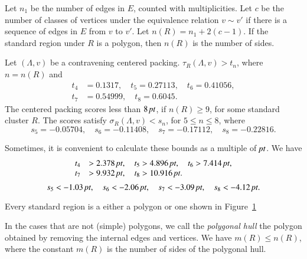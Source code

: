 Let $n_1$ be the number of edges in $E$, counted with multiplicities.
Let $c$ be the number of classes of vertices under the equivalence
relation $v\sim v'$ if there is a sequence of edges in $E$ from $v$ to
$v'$. Let $n(R)=n_1+2(c-1)$. If the standard region under $R$ is a
polygon, then $n(R)$ is the number of sides.

\begin{theorem}
    \label{thm:the-main-theorem}
    Let $(\Lambda,v)$ be a contravening centered packing.
$\tau_R(\Lambda,v) > t_n$, where $n=n(R)$ and
    $$
    \begin{array}{lll}
    t_4&=0.1317,\quad t_5=0.27113,\quad
    t_6=0.41056,\\
    t_7&=0.54999,\quad t_8=0.6045.
    \end{array}
    $$
The centered packing scores less than $8\,\hbox{\it pt}$, if $n(R)\ge 9$,
for some standard cluster $R$. The scores satisfy
$\sigma_R(\Lambda,v)<s_n$, for $5\le n\le 8$, where
    $$
    s_5=-0.05704,\quad s_6=-0.11408,\quad
    s_7=-0.17112,\quad s_8=-0.22816.
    $$
\end{theorem}

Sometimes, it is convenient to calculate these bounds as a multiple
of $\hbox{\it pt}$.  We have
    $$
    \begin{array}{lll}
    t_4&>2.378\,\hbox{\it pt},\quad t_5>4.896\,\hbox{\it pt},\quad
    t_6>7.414\,\hbox{\it pt},\\
    t_7&>9.932\,\hbox{\it pt},\quad
    t_8>10.916\,\hbox{\it pt}.
    \end{array}
    $$
    $$
    s_5 < -1.03\,\hbox{\it pt},\quad s_6<-2.06\,\hbox{\it pt},\quad
    s_7<-3.09\,\hbox{\it pt},\quad s_8<-4.12\,\hbox{\it pt}.
    $$




\begin{corollary}
    \label{cor:std-aggregate-list}
Every standard region is a either a polygon or one shown in
Figure~\ref{fig:std-aggregates}
\end{corollary}



\begin{figure}[htb]
  \centering
  \caption{}
  \label{fig:std-aggregates}
\end{figure}


In the cases that are not (simple) polygons, we call the {\it polygonal
hull\/} the polygon obtained by removing the internal edges and
vertices. We have $m(R)\le n(R)$, where the constant $m(R)$ is the
number of sides of the polygonal hull.

